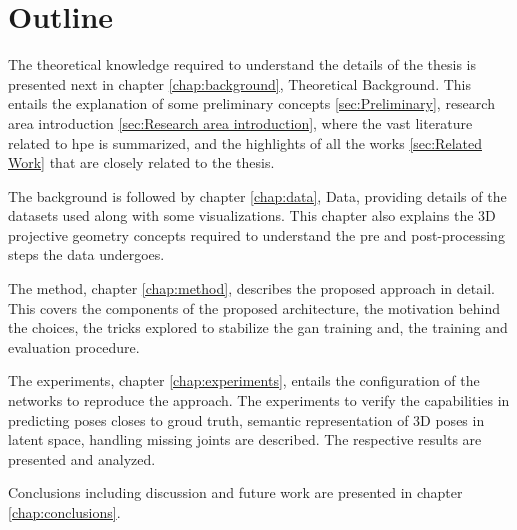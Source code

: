 \section{Outline}
\label{sec:outline}
The theoretical knowledge required to understand the details of the thesis is presented next in chapter \ref{chap:background}, Theoretical Background. This entails the explanation of some preliminary concepts \ref{sec:Preliminary}, research area introduction \ref{sec:Research area introduction}, where the vast literature related to \ac{hpe} is summarized, and the highlights of all the works \ref{sec:Related Work} that are closely related to the thesis.

The background is followed by chapter \ref{chap:data}, Data,  providing details of the datasets used along with some visualizations. This chapter also explains the 3D projective geometry concepts required to understand the pre and post-processing steps the data undergoes.

The method, chapter \ref{chap:method}, describes the proposed approach in detail. This covers the components of the proposed architecture, the motivation behind the choices, the tricks explored to stabilize the \ac{gan} training and, the training and evaluation procedure.

The experiments, chapter \ref{chap:experiments}, entails the configuration of the networks to reproduce the approach. The experiments to verify the capabilities in predicting poses closes to groud truth, semantic representation of 3D poses in latent space, handling missing joints are described. The respective results are presented and analyzed.  

Conclusions including discussion and future work are presented in chapter \ref{chap:conclusions}.


